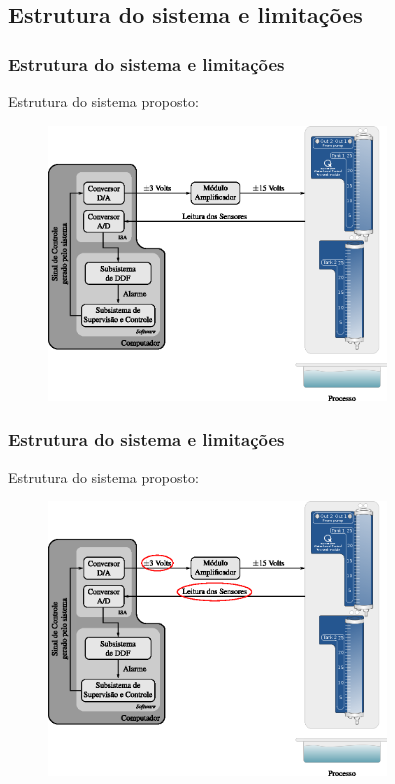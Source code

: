 \documentclass{beamer}
\begin{document}
\subsection{Estrutura do sistema e limitações}
\begin{frame}
    \frametitle{Estrutura do sistema e limitações}

    Estrutura do sistema proposto:

\begin{figure}[htb]
\centering
    \includegraphics[width=0.8\textwidth]{imgs/sistema/eps/func_sistema}
\end{figure}
\end{frame}

\begin{frame}
    \frametitle{Estrutura do sistema e limitações}

    Estrutura do sistema proposto:

\begin{figure}[htb]
\centering
    \includegraphics[width=0.8\textwidth]{imgs/sistema/eps/func_sistema_mod}
\end{figure}
\end{frame}
\end{document}
